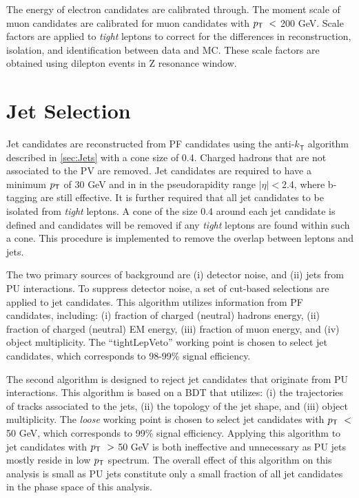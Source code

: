 The energy of electron candidates are calibrated through. The moment scale of muon candidates are calibrated for muon candidates with $p_{\textsf{T}}~<$ 200 GeV. Scale factors are applied to \emph{tight} leptons to correct for the differences in reconstruction, isolation, and identification between data and \ac{MC}. These scale factors are obtained using dilepton events in Z resonance window.
\section{Jet Selection}
\label{sec:Jets}

Jet candidates are reconstructed from \ac{PF} candidates using the anti-$k_{\textsf{T}}$ algorithm described in \autoref{sec:Jets} with a cone size of 0.4. Charged hadrons that are not associated to the \ac{PV} are removed. Jet candidates are required to have a minimum $p_{\textsf{T}}$ of 30 GeV and in in the pseudorapidity range $|\eta|<$2.4, where b-tagging are still effective. It is further required that all jet candidates to be isolated from \emph{tight} leptons. A cone of the size 0.4 around each jet candidate is defined and candidates will be removed if any \emph{tight} leptons are found within such a cone. This procedure is implemented to remove the overlap between leptons and jets. 

The two primary sources of background are (i) detector noise, and (ii) jets from \ac{PU} interactions. To suppress detector noise, a set of cut-based selections are applied to jet candidates. This algorithm utilizes information from \ac{PF} candidates, including: (i) fraction of charged (neutral) hadrons energy, (ii) fraction of charged (neutral) EM energy, (iii) fraction of muon energy, and (iv) object multiplicity. The ``tightLepVeto'' working point is chosen to select jet candidates, which corresponds to 98-99\% signal efficiency.

The second algorithm is designed to reject jet candidates that originate from \ac{PU} interactions. This algorithm is based on a \ac{BDT} that utilizes: (i) the trajectories of tracks associated to the jets, (ii) the topology of the jet shape, and (iii) object multiplicity. The \emph{loose} working point is chosen to select jet candidates with $p_{\textsf{T}}~<$ 50 GeV, which corresponds to 99\% signal efficiency. Applying this algorithm to jet candidates with $p_{\textsf{T}}~>$ 50 GeV is both ineffective and unnecessary as \ac{PU} jets mostly reside in low $p_{\textsf{T}}$ spectrum. The overall effect of this algorithm on this analysis is small as \ac{PU} jets constitute only a small fraction of all jet candidates in the phase space of this analysis. 

